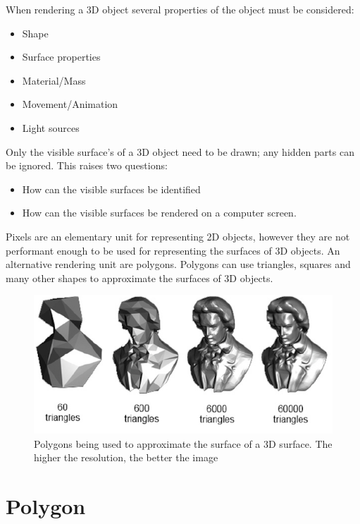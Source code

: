 \documentclass[
]{book}
\providecommand{\tightlist}{%
  \setlength{\itemsep}{0pt}\setlength{\parskip}{0pt}}
\begin{document}
When rendering a 3D object several properties of the object must be considered:

\begin{itemize}
\tightlist
\item
  Shape
\item
  Surface properties
\item
  Material/Mass
\item
  Movement/Animation
\item
  Light sources
\end{itemize}

Only the visible surface's of a 3D object need to be drawn; any hidden parts can be ignored. This raises two questions:

\begin{itemize}
\tightlist
\item
  How can the {visible surfaces} be {identified}
\item
  How can the {visible surfaces} be {rendered} on a computer screen.
\end{itemize}

{Pixels} are an elementary unit for representing 2D objects, however they are {not performant} enough to be used for representing the surfaces of 3D objects. An alternative rendering unit are {polygons}. {Polygons} can use triangles, squares and many other shapes to approximate the surfaces of 3D objects.

\begin{figure}
\centering
\includegraphics{img/08-image03.png}
\caption{\label{fig:polygon-repr}Polygons being used to approximate the surface of a 3D surface. The higher the resolution, the better the image}
\end{figure}

\hypertarget{polygon}{%
\section{Polygon}\label{polygon}}
\end{document}
